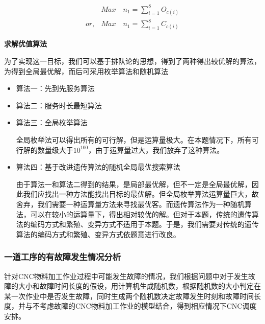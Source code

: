 \documentclass[withoutpreface,bwprint]{cumcmthesis} %
\begin{document}
\begin{eqnarray}
 & Max\quad n_{1}=\sum_{i=1}^8 O_{c(i)}\\
or, & Max\quad n_{1}=\sum_{i=1}^8 C_{c(i)}
\end{eqnarray}

\textbf{求解优值算法}

为了实现这一目标，我们可以基于排队论的思想，得到了两种得出较优解的算法，为得到全局最优解，而后可采用枚举算法和随机算法
\begin{itemize}
\vspace{6pt}
\item 算法一：先到先服务算法


\vspace{6pt}
\item 算法二：服务时长最短算法


\vspace{6pt}
\item 算法三：全局枚举算法

全局枚举法可以得出所有的可行解，但是运算量极大。在本题情况下，所有可行解的数量级大于$10^{100}$，由于运算量过大，我们放弃了这种算法。
\vspace{6pt}
\item 算法四：基于改进遗传算法的随机全局最优搜索算法

由于算法一和算法二得到的结果，是局部最优解，但不一定是全局最优解，因此我们应找出一种方法能找出目标的最优解。但全局枚举算法运算量巨大，故舍弃，我们需要一种运算量方法来寻找最优客。而遗传算法作为一种随机算法，可以在较小的运算量下，得出相对较优的解。但对于本题，传统的遗传算法的编码方式和繁殖、变异方式不适用于本题。于是，我们需要对传统的遗传算法的编码方式和繁殖、变异方式依题意进行改良。


\end{itemize}















\subsubsection{一道工序的有故障发生情况分析}
针对CNC物料加工作业过程中可能发生故障的情况，我们根据问题中对于发生故障的大小和故障时间长度的假设，用计算机生成随机数，根据随机数的大小判定在某一次作业中是否发生故障，同时生成两个随机数决定故障发生时刻和故障时间长度，并与不考虑故障的CNC物料加工作业的模型结合，得到相应情况下CNC调度安排。
\end{document}
